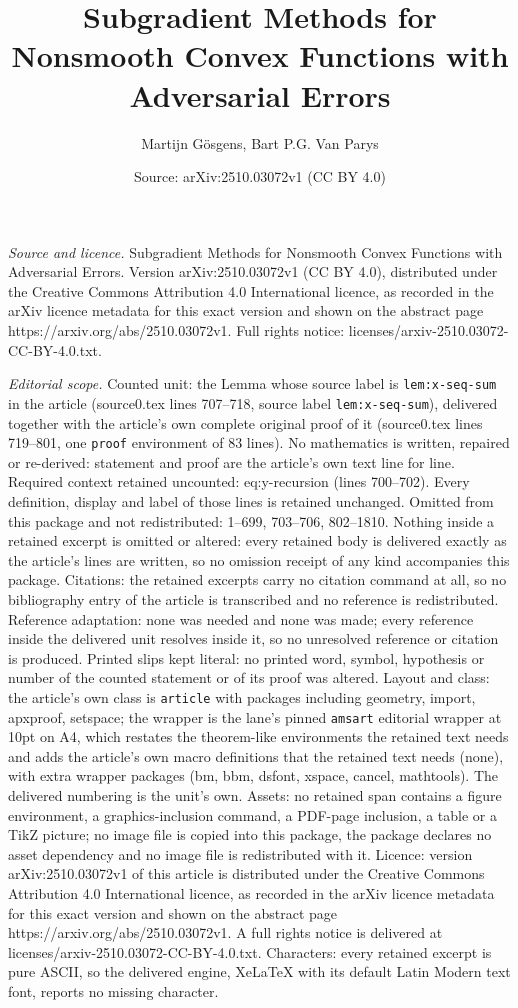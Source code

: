\documentclass[10pt,a4paper]{amsart}
\title[Subgradient Methods for Nonsmooth Convex Functions with Adve]{Subgradient Methods for Nonsmooth Convex Functions with Adversarial Errors}
\author{Martijn G\"osgens, Bart P.G. Van Parys}
\date{Source: arXiv:2510.03072v1 (CC BY 4.0)}
\begin{document}
\maketitle

\noindent\emph{Source and licence.} Subgradient Methods for Nonsmooth Convex Functions with Adversarial Errors. Version arXiv:2510.03072v1 (CC BY 4.0), distributed under the Creative Commons Attribution 4.0 International licence, as recorded in the arXiv licence metadata for this exact version and shown on the abstract page https://arxiv.org/abs/2510.03072v1. Full rights notice: licenses/arxiv-2510.03072-CC-BY-4.0.txt.\par\smallskip

\noindent\textit{Editorial scope.} Counted unit: the Lemma whose source label is \texttt{lem:x-seq-sum} in the article (source0.tex lines 707--718, source label \texttt{lem:x-seq-sum}), delivered together with the article's own complete original proof of it (source0.tex lines 719--801, one \texttt{proof} environment of 83 lines). No mathematics is written, repaired or re-derived: statement and proof are the article's own text line for line. Required context retained uncounted: eq:y-recursion (lines 700--702). Every definition, display and label of those lines is retained unchanged. Omitted from this package and not redistributed: 1--699, 703--706, 802--1810. Nothing inside a retained excerpt is omitted or altered: every retained body is delivered exactly as the article's lines are written, so no omission receipt of any kind accompanies this package. Citations: the retained excerpts carry no citation command at all, so no bibliography entry of the article is transcribed and no reference is redistributed. Reference adaptation: none was needed and none was made; every reference inside the delivered unit resolves inside it, so no unresolved reference or citation is produced. Printed slips kept literal: no printed word, symbol, hypothesis or number of the counted statement or of its proof was altered. Layout and class: the article's own class is \texttt{article} with packages including geometry, import, apxproof, setspace; the wrapper is the lane's pinned \texttt{amsart} editorial wrapper at 10pt on A4, which restates the theorem-like environments the retained text needs and adds the article's own macro definitions that the retained text needs (none), with extra wrapper packages (bm, bbm, dsfont, xspace, cancel, mathtools). The delivered numbering is the unit's own. Assets: no retained span contains a figure environment, a graphics-inclusion command, a PDF-page inclusion, a table or a TikZ picture; no image file is copied into this package, the package declares no asset dependency and no image file is redistributed with it. Licence: version arXiv:2510.03072v1 of this article is distributed under the Creative Commons Attribution 4.0 International licence, as recorded in the arXiv licence metadata for this exact version and shown on the abstract page https://arxiv.org/abs/2510.03072v1. A full rights notice is delivered at licenses/arxiv-2510.03072-CC-BY-4.0.txt. Characters: every retained excerpt is pure ASCII, so the delivered engine, XeLaTeX with its default Latin Modern text font, reports no missing character.
\end{document}
